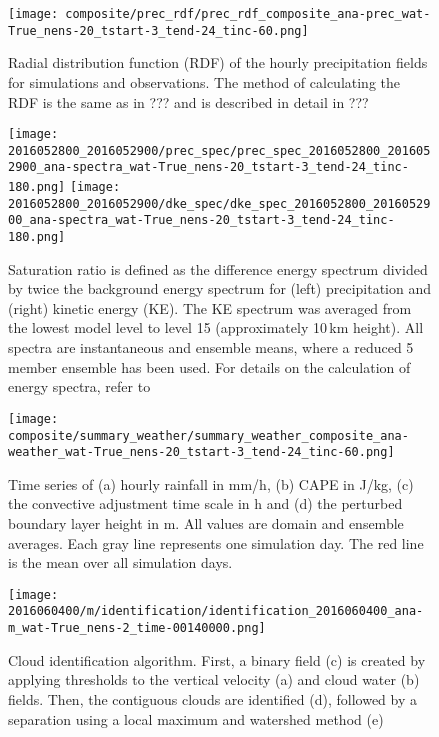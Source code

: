 \documentclass[a4paper, 12pt]{article}
\begin{document}
\begin{figure}[h!]
\noindent \centering
\texttt{[image: composite/prec\_rdf/prec\_rdf\_composite\_ana-prec\_wat-True\_nens-20\_tstart-3\_tend-24\_tinc-60.png]}\\
\caption{Radial distribution function (RDF) of the hourly precipitation fields for simulations and observations. The method of calculating the RDF is the same as in ??? and is described in detail in ???} \label{fig:prec_rdf}
\end{figure}

\begin{figure}[h!]
\noindent \centering
\texttt{[image: 2016052800\_2016052900/prec\_spec/prec\_spec\_2016052800\_2016052900\_ana-spectra\_wat-True\_nens-20\_tstart-3\_tend-24\_tinc-180.png]}
\texttt{[image: 2016052800\_2016052900/dke\_spec/dke\_spec\_2016052800\_2016052900\_ana-spectra\_wat-True\_nens-20\_tstart-3\_tend-24\_tinc-180.png]}\\
\caption{Saturation ratio is defined as the difference energy spectrum divided by twice the background energy spectrum for (left) precipitation and (right) kinetic energy (KE). The KE spectrum was averaged from the lowest model level to level 15 (approximately 10\,km height). All spectra are instantaneous and ensemble means, where a reduced 5 member ensemble has been used. For details on the calculation of energy spectra, refer to \cite{Selz2015b}} \label{fig:spectra}
\end{figure}

\begin{figure}[h!]
\noindent \centering
\texttt{[image: composite/summary\_weather/summary\_weather\_composite\_ana-weather\_wat-True\_nens-20\_tstart-3\_tend-24\_tinc-60.png]}\\
\caption{Time series of (a) hourly rainfall in mm/h, (b) CAPE in J/kg, (c) the convective adjustment time scale in h and (d) the perturbed boundary layer height in m. All values are domain and ensemble averages. Each gray line represents one simulation day. The red line is the mean over all simulation days.} \label{fig:summary_weather}
\end{figure}

\begin{figure}[ht]
\noindent \centering
\texttt{[image: 2016060400/m/identification/identification\_2016060400\_ana-m\_wat-True\_nens-2\_time-00140000.png]}\\
\caption{Cloud identification algorithm. First, a binary field (c) is created by applying thresholds to the vertical velocity (a) and cloud water (b) fields. Then, the contiguous clouds are identified (d), followed by a separation using a local maximum and watershed method (e)} \label{fig:Fig4}
\end{figure}
\end{document}
